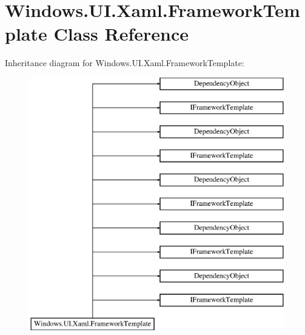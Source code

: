 \hypertarget{class_windows_1_1_u_i_1_1_xaml_1_1_framework_template}{}\section{Windows.\+U\+I.\+Xaml.\+Framework\+Template Class Reference}
\label{class_windows_1_1_u_i_1_1_xaml_1_1_framework_template}
Inheritance diagram for Windows.\+U\+I.\+Xaml.\+Framework\+Template\+:\begin{figure}[H]
\begin{center}
\leavevmode
\includegraphics[height=11.000000cm]{class_windows_1_1_u_i_1_1_xaml_1_1_framework_template}
\end{center}
\end{figure}
